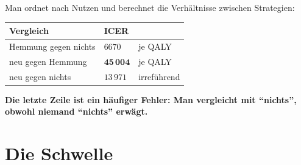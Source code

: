 \begin{merksatz}
Man ordnet nach Nutzen und berechnet die Verhältnisse zwischen  Strategien:

\begin{center}
{\small
\renewcommand{\arraystretch}{1.5}
\begin{tabular}{@{}P{3.0cm}P{2.4cm}P{2.6cm}@{}}
\toprule
\textbf{Vergleich} & \textbf{ICER} & \\
\midrule
Hemmung gegen nichts & $6670$ & je QALY\\
neu gegen Hemmung & $\mathbf{45\,004}$ & je QALY\\
\midrule
neu gegen nichts & $13\,971$ & \textcolor{akzent}{irreführend}\\
\bottomrule
\end{tabular}}
\end{center}

\begin{center}
\begin{minipage}{0.9\textwidth}
\textbf{Die letzte Zeile ist ein häufiger Fehler: Man vergleicht mit \enquote{nichts}, obwohl niemand \enquote{nichts} erwägt.}
\end{minipage}
\end{center}

\begin{center}
\begin{minipage}{0.88\textwidth}
\end{minipage}
\end{center}
\end{merksatz}

\section{Die Schwelle}

